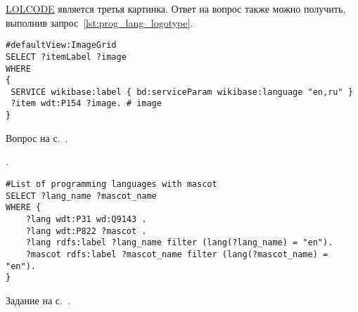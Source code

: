 \begin{task}
\label{answer:prog_lang_2}
    \href{https://ru.wikipedia.org/wiki/LOLCODE}{LOLCODE} является третья картинка. 
    Ответ на вопрос также можно получить, выполнив запрос~\ref{lst:prog_lang_logotype}. 
	\begin{lstlisting}[language=SPARQL, caption={{\href{https://w.wiki/v4U}{Логотипы языков программирования}}\protect\footnotemark}, label=lst:prog_lang_logotype]
#defaultView:ImageGrid
SELECT ?itemLabel ?image
WHERE
{
 SERVICE wikibase:label { bd:serviceParam wikibase:language "en,ru" }
 ?item wdt:P154 ?image. # image
}
\end{lstlisting}

\small{\AnswerBackref Вопрос на с.~\pageref{question:prog_lang_2}.}
\end{task}



\begin{task}
    \label{answer:prog_langs_4}
    . 
	\begin{lstlisting}[language=SPARQL, caption={{\href{https://w.wiki/v4e}{<<Персонажи-талисманы>> языков программирования}}\protect\footnotemark}, label=lst:prog_lang_answer_4]
#List of programming languages with mascot
SELECT ?lang_name ?mascot_name
WHERE {
    ?lang wdt:P31 wd:Q9143 .
    ?lang wdt:P822 ?mascot .
    ?lang rdfs:label ?lang_name filter (lang(?lang_name) = "en").
    ?mascot rdfs:label ?mascot_name filter (lang(?mascot_name) = "en").
}
	\end{lstlisting}
    
    \small{Задание на с.~\pageref{prog_lang_test}.}
\end{task}




